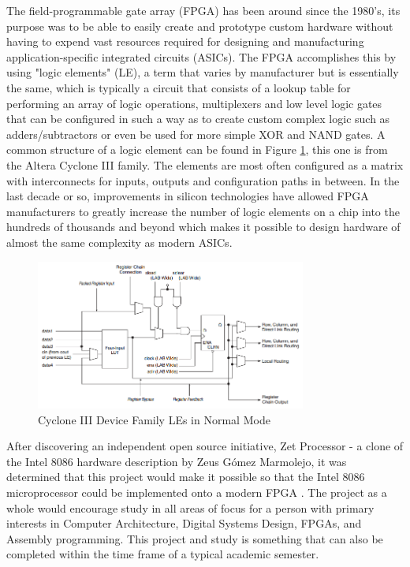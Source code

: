 \documentclass[pdftex,10.5pt]{report}
\begin{document}
The field-programmable gate array (FPGA) has been around since the 1980's, its purpose was to be able to easily create and prototype custom hardware without having to expend vast resources required for designing and manufacturing application-specific integrated circuits (ASICs). The FPGA accomplishes this by using "logic elements" (LE), a term that varies by manufacturer but is essentially the same, which is typically a circuit that consists of a lookup table for performing an array of logic operations,  multiplexers and low level logic gates that can be configured in such a way as to create custom complex logic such as adders/subtractors or even be used for more simple XOR and NAND gates. A common structure of a logic element can be found in Figure \ref{fig:LogicElement}, this one is from the Altera Cyclone III family. The elements  are most often configured as a matrix with interconnects for inputs, outputs and configuration paths in between. In the last decade or so, improvements in silicon technologies have allowed FPGA manufacturers to greatly increase the number of logic elements on a chip into the hundreds of thousands and beyond which makes it possible to design hardware of almost the same complexity as modern ASICs.

\begin{figure}[!h]
	\centering
	\includegraphics[width=3.5in]{figures/LogicElement.png}
	\caption{Cyclone III Device Family LEs in Normal Mode \cite{CycloneHandbook}}
	\label{fig:LogicElement}
\end{figure}

After discovering an independent open source initiative, Zet Processor - a clone of the Intel 8086 hardware description by Zeus Gómez Marmolejo, it was determined that this project would make it possible so that the Intel 8086 microprocessor could be implemented onto a modern FPGA \cite{ZetProcessor}. The project as a whole would encourage study in all areas of focus for a person with primary interests in Computer Architecture, Digital Systems Design, FPGAs, and Assembly programming. This project and study  is something that can also be completed within the time frame of a typical academic semester.
\end{document}
